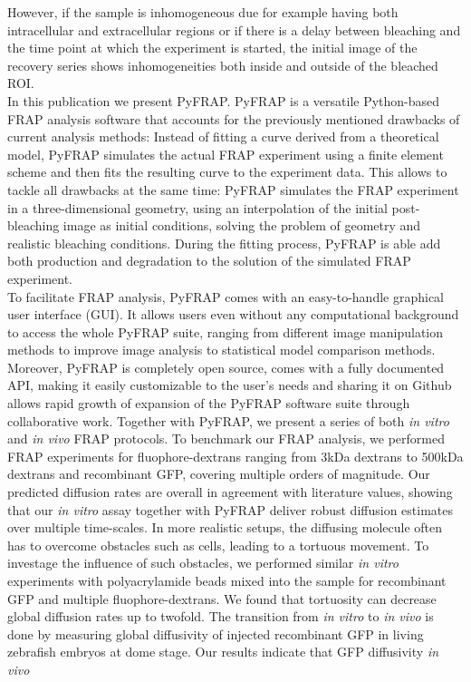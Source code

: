 \documentclass[a4paper,10pt,twocolumn]{article}
\newcommand{\invivo}{\textit{in vivo }}
\newcommand{\invitro}{\textit{in vitro }}
\begin{document}
However, if the sample is inhomogeneous due for example having both intracellular and extracellular regions or if there is a delay between bleaching and the time point at which the experiment is started,
the initial image of the recovery series shows inhomogeneities both inside and outside of the bleached ROI.\\
In this publication we present PyFRAP. PyFRAP is a versatile Python-based FRAP analysis software that accounts for the previously mentioned drawbacks of current analysis methods: Instead of fitting a curve 
derived from a theoretical model, PyFRAP simulates the actual FRAP experiment using a finite element scheme and then fits the resulting curve to the experiment data. This allows to tackle all drawbacks at the 
same time: PyFRAP simulates the FRAP experiment in a three-dimensional geometry, using an interpolation of the initial post-bleaching image as initial conditions, solving the problem of geometry and realistic
bleaching conditions. During the fitting process, PyFRAP is able add both production and degradation to the solution of the simulated FRAP experiment. \\
To facilitate FRAP analysis, PyFRAP comes with an easy-to-handle graphical user interface (GUI). It allows users even without any computational background to access the whole PyFRAP suite, ranging from 
different image manipulation methods to improve image analysis to statistical model comparison methods. Moreover, PyFRAP is completely open source, comes with a fully documented API, making it easily 
customizable to the user's needs and sharing it on Github allows rapid growth of expansion of the PyFRAP software suite through collaborative work.
Together with PyFRAP, we present a series of both \invitro and \invivo FRAP protocols. To benchmark our FRAP analysis, we performed FRAP experiments for fluophore-dextrans ranging from 3kDa dextrans to 500kDa 
dextrans and recombinant GFP, covering multiple orders of magnitude. Our predicted diffusion rates are overall  in agreement with literature values, showing that our \invitro assay together with PyFRAP deliver robust diffusion 
estimates over multiple time-scales. In more realistic setups, the diffusing molecule often has to overcome obstacles such as cells, leading to a tortuous movement. To investage the influence of such obstacles,
we performed similar \invitro experiments with polyacrylamide beads mixed into the sample for recombinant GFP and multiple fluophore-dextrans. We found that tortuosity can decrease global diffusion rates up 
to twofold. The transition from \invitro to \invivo is done by measuring global diffusivity of injected recombinant GFP in living zebrafish embryos at dome stage. Our results indicate that GFP diffusivity \invivo
\end{document}
